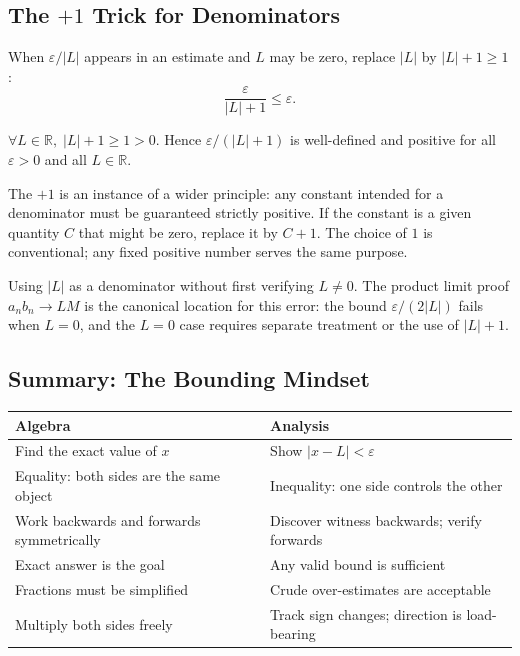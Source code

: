\subsection*{\texorpdfstring{The $+1$ Trick for Denominators}{The +1 Trick for Denominators}}
\label{subsec:plus-one}

When $\varepsilon/|L|$ appears in an estimate and $L$ may be zero, replace
$|L|$ by $|L|+1\geq 1$:
\[
  \frac{\varepsilon}{|L|+1}\leq\varepsilon.
\]

\begin{remark}
$\forall L\in\mathbb{R},\;|L|+1\geq 1>0$. Hence
$\varepsilon/(|L|+1)$ is well-defined and positive for all $\varepsilon>0$
and all $L\in\mathbb{R}$.
\end{remark}

\begin{remark}[Generalisation]
The $+1$ is an instance of a wider principle: any constant intended for a
denominator must be guaranteed strictly positive. If the constant is a
given quantity $C$ that might be zero, replace it by $C+1$. The choice of
$1$ is conventional; any fixed positive number serves the same purpose.
\end{remark}

\begin{remark}
Using $|L|$ as a denominator without first verifying $L\neq 0$. The product
limit proof $a_nb_n\to LM$ is the canonical location for this error: the
bound $\varepsilon/(2|L|)$ fails when $L=0$, and the $L=0$ case requires
separate treatment or the use of $|L|+1$.
\end{remark}

\subsection*{Summary: The Bounding Mindset}

\medskip
\begin{tabular}{@{}ll@{}}
\toprule
\textbf{Algebra} & \textbf{Analysis} \\
\midrule
Find the exact value of $x$
  & Show $|x-L|<\varepsilon$ \\
Equality: both sides are the same object
  & Inequality: one side controls the other \\
Work backwards and forwards symmetrically
  & Discover witness backwards; verify forwards \\
Exact answer is the goal
  & Any valid bound is sufficient \\
Fractions must be simplified
  & Crude over-estimates are acceptable \\
Multiply both sides freely
  & Track sign changes; direction is load-bearing \\
\bottomrule
\end{tabular}
\medskip

